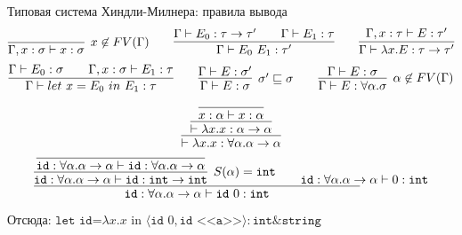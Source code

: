 \documentclass[aspectratio=169]{beamer}
\begin{document}
\begin{frame}{Типовая система Хиндли-Милнера: правила вывода}\vspace{-0.7cm}
    $$\infer[x \not \in FV(\Gamma)]{\Gamma, x : \sigma \vdash x : \sigma}{}\qquad
    \infer{\Gamma \vdash E_0\ E_1 : \tau'}{\Gamma \vdash E_0 : \tau \rightarrow \tau' \qquad \Gamma \vdash E_1 : \tau}\qquad
    \infer{\Gamma \vdash \lambda x.E : \tau \rightarrow \tau'}{\Gamma, x : \tau \vdash E : \tau'}$$
    $$\infer{\Gamma \vdash let\ x = E_0\ in\ E_1 : \tau}{\Gamma \vdash E_0 : \sigma \qquad \Gamma, x : \sigma \vdash E_1 : \tau}\qquad
    \infer[\sigma' \sqsubseteq \sigma]{\Gamma \vdash E : \sigma}{\Gamma \vdash E : \sigma'}\qquad
    \infer[\alpha \not \in FV(\Gamma)]{\Gamma \vdash E : \forall \alpha.\sigma}{\Gamma \vdash E : \sigma}$$


\vspace{-0.1cm}
\begin{exm}
\end{exm}\vspace{-0.8cm}
$$
\infer{\vdash\lambda x.x:\forall\alpha.\alpha\rightarrow\alpha}{\infer{\vdash\lambda x.x:\alpha\rightarrow\alpha}{\infer{x:\alpha\vdash x:\alpha}{}}}
$$
\vspace{-0.3cm}
$$\infer{\texttt{id}:\forall\alpha.\alpha\rightarrow\alpha\vdash\texttt{id}\ 0:\texttt{int}}
        {\infer[S(\alpha)=\texttt{int}]{\texttt{id}:\forall\alpha.\alpha\rightarrow\alpha\vdash\texttt{id}:\texttt{int}\rightarrow\texttt{int}}
               {\infer{\texttt{id}:\forall\alpha.\alpha\rightarrow\alpha\vdash\texttt{id}:\forall\alpha.\alpha\rightarrow\alpha}{}}\qquad
         \texttt{id}:\forall\alpha.\alpha\rightarrow\alpha\vdash 0:\texttt{int}}
$$


Отсюда: $\texttt{let id=}\lambda x.x\text{ in }\langle \texttt{id }0,\texttt{id <<a>>}\rangle:\texttt{int}\&\texttt{string}$

\end{frame}
\end{document}
